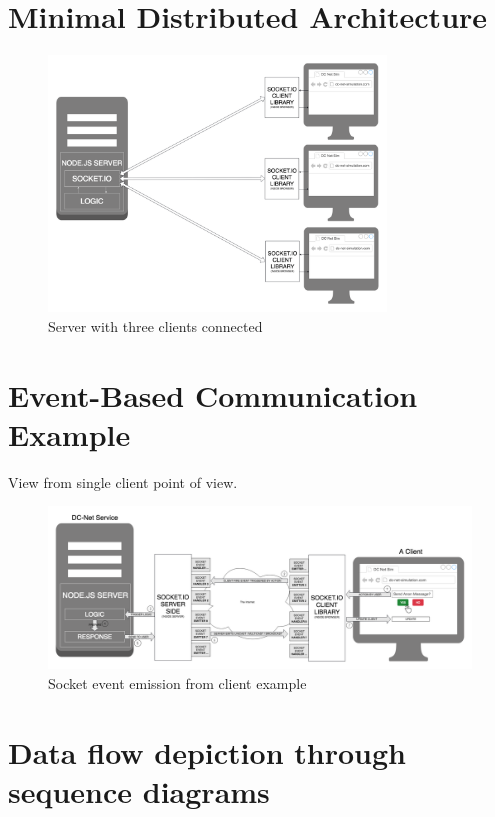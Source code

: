 \section{Minimal Distributed Architecture}

\begin{figure}[H]
    \centering
    \includegraphics[width=0.8\textwidth]{Images/Design/distributedArchitecture.png}
    \caption{Server with three clients connected}
    \label{fig:distrubtedArchitecture}
\end{figure}


\section{Event-Based Communication Example}
View from single client point of view.

\begin{figure}[H]
    \centering
    \includegraphics[width=1\textwidth]{Images/Design/singleClientSocketEvent.png}
    \caption{Socket event emission from client example}
    \label{fig:socketEventEmission}
\end{figure}



\section{Data flow depiction through sequence diagrams}


